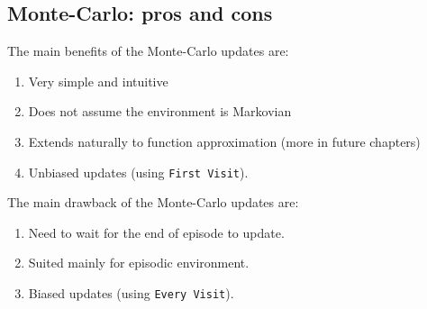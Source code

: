 \subsection{Monte-Carlo: pros and cons}

The main benefits of the Monte-Carlo updates are:
\begin{enumerate}
\item Very simple and intuitive
\item Does not assume the environment is Markovian
\item Extends naturally to function approximation (more in future
chapters)
\item Unbiased updates (using {\tt First Visit}).
\end{enumerate}

\noindent
The main drawback of the Monte-Carlo updates are:
\begin{enumerate}
\item Need to wait for the end of episode to update.
\item Suited mainly for episodic environment.
\item Biased updates (using {\tt Every Visit}).
\end{enumerate}
